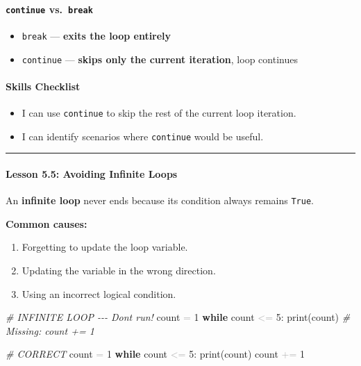 \documentclass[
  justified,
  openright,
]{tufte-book}
\let\subsection\paragraph
\let\paragraph\paragraph
\newcommand{\KeywordTok}[1]{\textcolor{CodeKeyword}{\textbf{#1}}}  %
\newcommand{\CommentTok}[1]{\textcolor{CodeComment}{\textit{#1}}}  %
\newcommand{\CodeNumTok}[1]{\textcolor{CodeNumber}{#1}}             %
\newcommand{\OperatorTok}[1]{\textcolor{DarkGray}{#1}}              %
\newenvironment{Shaded}{%
  \begin{mdframed}[style=TufteCode]%
}{%
  \end{mdframed}%
}
\let\subsection\paragraph
\let\paragraph\paragraph
\providecommand{\tightlist}{%
  \setlength{\itemsep}{0pt}\setlength{\parskip}{0pt}}
\begin{document}
\subsection{\texorpdfstring{\texttt{continue}
vs.~\texttt{break}}{continue vs.~break}}\label{continue-vs.-break}

\begin{itemize}
\tightlist
\item
  \texttt{break} --- \textbf{exits the loop entirely}
\item
  \texttt{continue} --- \textbf{skips only the current iteration}, loop
  continues
\end{itemize}

\subsection{Skills Checklist}\label{skills-checklist-25}

\begin{itemize}
\tightlist
\item[$\square$]
  I can use \texttt{continue} to skip the rest of the current loop
  iteration.
\item[$\square$]
  I can identify scenarios where \texttt{continue} would be useful.
\end{itemize}

\begin{center}\rule{0.5\linewidth}{0.5pt}\end{center}

\subsection{Lesson 5.5: Avoiding Infinite
Loops}\label{lesson-5.5-avoiding-infinite-loops}

An \textbf{infinite loop} never ends because its condition always
remains \texttt{True}.

\textbf{Common causes:}

\begin{enumerate}
\def\labelenumi{\arabic{enumi}.}
\tightlist
\item
  Forgetting to update the loop variable.
\item
  Updating the variable in the wrong direction.
\item
  Using an incorrect logical condition.
\end{enumerate}

\begin{Shaded}
\begin{Highlighting}[]
\CommentTok{\# INFINITE LOOP {-}{-}{-} Don\textquotesingle{}t run!}
count \OperatorTok{=} \CodeNumTok{1}
\KeywordTok{while} count \OperatorTok{\textless{}=} \CodeNumTok{5}:
    print(count)
    \CommentTok{\# Missing: count += 1}
 
\CommentTok{\# CORRECT}
count \OperatorTok{=} \CodeNumTok{1}
\KeywordTok{while} count \OperatorTok{\textless{}=} \CodeNumTok{5}:
    print(count)
    count \OperatorTok{+=} \CodeNumTok{1}
\end{Highlighting}
\end{Shaded}
\end{document}
